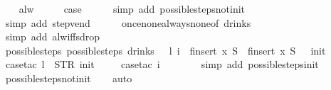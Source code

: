 \begin{isabellebody}
\ \ \isamarkupfalse%
\ alw\isanewline
\ \ \isamarkupfalse%
\ \isamarkupfalse%
\ {\isacharquery}case\isanewline
\ \ \ \ \isamarkupfalse%
\ {\isacharparenleft}simp\ add{\isacharcolon}\ possible{\isacharunderscore}steps{\isacharunderscore}not{\isacharunderscore}init{\isacharparenright}\isanewline
\ \ \ \ \isamarkupfalse%
\ {\isacharparenleft}simp\ add{\isacharcolon}\ step{\isacharunderscore}{}{\isacharunderscore}vend{\isacharparenright}\isanewline
\ \ \ \ \isamarkupfalse%
\ once{\isacharunderscore}none{\isacharunderscore}always{\isacharunderscore}none{\isacharbrackleft}of\ drinks{\isacharbrackright}\isanewline
\ \ \ \ \isamarkupfalse%
\ {\isacharparenleft}simp\ add{\isacharcolon}\ alw{\isacharunderscore}iff{\isacharunderscore}sdrop{\isacharparenright}\isanewline
{}\isamarkupfalse%
%
\endisatagproof
{\isafoldproof}%
%
\isadelimproof
\isanewline
%
\endisadelimproof
\isanewline
{}\isamarkupfalse%
\ possible{\isacharunderscore}steps{\isacharunderscore}{}{\isacharcolon}\ {\isachardoublequoteopen}possible{\isacharunderscore}steps\ drinks\ {}\ {\isacharless}{\isachargreater}\ l\ i\ {\isacharequal}\ finsert\ x\ S{\isacharprime}\ {\isasymLongrightarrow}\ finsert\ x\ S{\isacharprime}\ {\isacharequal}\ {\isacharbraceleft}{\isacharbar}{\isacharparenleft}{}{\isacharcomma}\ init{\isacharparenright}{\isacharbar}{\isacharbraceright}{\isachardoublequoteclose}\isanewline
%
\isadelimproof
\ \ %
\endisadelimproof
%
\isatagproof
{}\isamarkupfalse%
\ {\isacharparenleft}case{\isacharunderscore}tac\ {\isachardoublequoteopen}l\ {\isacharequal}\ STR\ {\isacharprime}{\isacharprime}init{\isacharprime}{\isacharprime}{\isachardoublequoteclose}{\isacharparenright}\isanewline
\ \ \ \isamarkupfalse%
\ {\isacharparenleft}case{\isacharunderscore}tac\ {\isachardoublequoteopen}i\ {\isacharequal}\ {\isacharbrackleft}{\isacharbrackright}{\isachardoublequoteclose}{\isacharparenright}\isanewline
\ \ \ \ \isamarkupfalse%
\ {\isacharparenleft}simp\ add{\isacharcolon}\ possible{\isacharunderscore}steps{\isacharunderscore}init{\isacharparenright}\isanewline
\ \ \isamarkupfalse%
\ possible{\isacharunderscore}steps{\isacharunderscore}not{\isacharunderscore}init\isanewline
\ \ \isamarkupfalse%
\ auto%
\endisatagproof
{\isafoldproof}%
%
\isadelimproof
\isanewline
%
\endisadelimproof
\isanewline
{}\isamarkupfalse%

\end{isabellebody}
